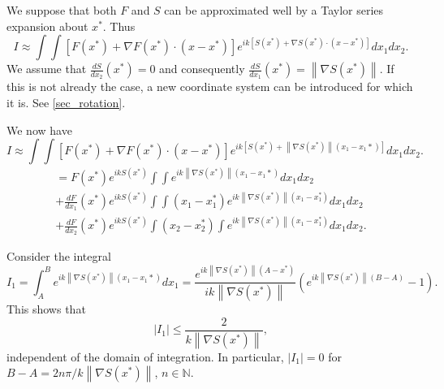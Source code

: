 \documentclass{article}
\newcommand{\norm}[1]{\left\lVert#1\right\rVert}
\theoremstyle{plain}
\begin{document}
We suppose that both $F$ and $S$ can be approximated well by a Taylor series expansion about $x^*$.
Thus
\begin{equation}
	I \approx \int\int \left[ F(x^*) + \nabla F(x^*) \cdot (x-x^*) \right] e^{ik\left[S(x^*) + \nabla S(x^*)\cdot (x-x^*) \right]} dx_1dx_2.
\end{equation}
We assume that $\frac{dS}{dx_2}(x^*) = 0$ and consequently $\frac{dS}{dx_1}(x^*) = \norm{\nabla S(x^*)}$.
If this is not already the case, a new coordinate system can be introduced for which it is. See \ref{sec_rotation}.


We now have
\begin{equation}
	I \approx \int\int \left[ F(x^*) + \nabla F(x^*) \cdot (x-x^*) \right] e^{ik\left[S(x^*) + \norm{\nabla S(x^*)}(x_1-x_1*) \right]} dx_1dx_2.
\end{equation}
\begin{multline}
	= F(x^*) e^{ikS(x^*)} \int\int e^{ik\norm{\nabla S(x^*)}(x_1-x_1*)} dx_1dx_2 \\
	+ \frac{dF}{dx_1}(x^*) e^{ikS(x^*)} \int\int (x_1-x_1^*) e^{ik\norm{\nabla S(x^*)}(x_1-x_1^*)} dx_1dx_2 \\
	+ \frac{dF}{dx_2}(x^*) e^{ikS(x^*)} \int (x_2-x_2^*) \int e^{ik\norm{\nabla S(x^*)}(x_1-x_1^*)} dx_1dx_2.
\end{multline}



Consider the integral
\begin{equation}
	I_1 = \int_A^B e^{ik\norm{\nabla S(x^*)}(x_1-x_1*)} dx_1 
	= \frac{e^{ik\norm{\nabla S(x^*)}(A-x^*)}}{ik\norm{\nabla S(x^*)}}
	\left( e^{ik\norm{\nabla S(x^*)}(B-A)}-1 \right).
\end{equation}
This shows that
\begin{equation}
	|I_1| \leq \frac{2}{k\norm{\nabla S(x^*)}},
\end{equation}
independent of the domain of integration.
In particular, $|I_1| = 0$ for $B-A = 2n\pi / k\norm{\nabla S(x^*)}$, $n\in\mathbb{N}$.
\end{document}
